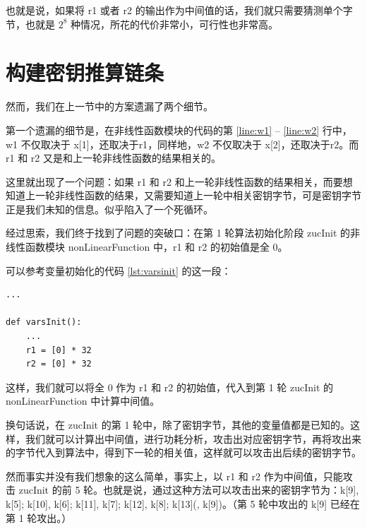也就是说，如果将 {\cnsls r1} 或者 {\cnsls r2} 的输出作为中间值的话，我们就只需要猜测单个字节，也就是 $2^8$ 种情况，所花的代价非常小，可行性也非常高。

\newpage

\section{构建密钥推算链条}

然而，我们在上一节中的方案遗漏了两个细节。

第一个遗漏的细节是，在非线性函数模块的代码的第 \ref{line:w1} -- \ref{line:w2} 行中，{\cnsls w1} 不仅取决于 {\cnsls x[1]}，还取决于{\cnsls r1}，同样地，{\cnsls w2} 不仅取决于 {\cnsls x[2]}，还取决于{\cnsls r2}。而 {\cnsls r1} 和 {\cnsls r2} 又是和上一轮非线性函数的结果相关的。

这里就出现了一个问题：如果 {\cnsls r1} 和 {\cnsls r2} 和上一轮非线性函数的结果相关，而要想知道上一轮非线性函数的结果，又需要知道上一轮中相关密钥字节，可是密钥字节正是我们未知的信息。似乎陷入了一个死循环。

经过思索，我们终于找到了问题的突破口：在第 1 轮算法初始化阶段 {\cnsls zucInit} 的非线性函数模块 {\cnsls nonLinearFunction} 中，{\cnsls r1} 和 {\cnsls r2} 的初始值是全 0。

可以参考变量初始化的代码 \ref{lst:varsinit} 的这一段：

\begin{lstlisting}[style=myPython]
...

def varsInit():
    ...
    r1 = [0] * 32
    r2 = [0] * 32
\end{lstlisting}

这样，我们就可以将全 0 作为 {\cnsls r1} 和 {\cnsls r2} 的初始值，代入到第 1 轮 {\cnsls zucInit} 的 {\cnsls nonLinearFunction} 中计算中间值。

换句话说，在 {\cnsls zucInit} 的第 1 轮中，除了密钥字节，其他的变量值都是已知的。这样，我们就可以计算出中间值，进行功耗分析，攻击出对应密钥字节，再将攻出来的字节代入到算法中，得到下一轮的相关值，这样就可以攻击出后续的密钥字节。

\vspace*{0.5\baselineskip}

然而事实并没有我们想象的这么简单，事实上，以 {\cnsls r1} 和 {\cnsls r2} 作为中间值，只能攻击 {\cnsls zucInit} 的前 5 轮。也就是说，通过这种方法可以攻击出来的密钥字节为：{\cnsls k[9], k[5]; k[10], k[6]; k[11], k[7]; k[12], k[8]; k[13](, k[9])}。（第 5 轮中攻出的 {\cnsls k[9]} 已经在第 1 轮攻出。）


